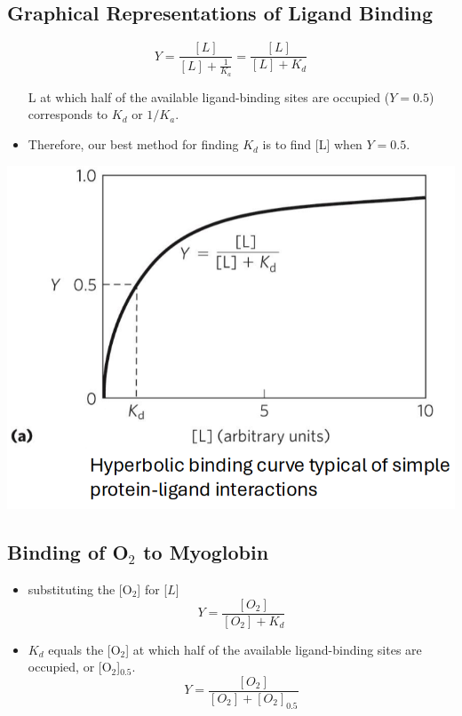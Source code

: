 \documentclass[10pt]{article}
\begin{document}
\subsection*{Graphical Representations of Ligand Binding}
\[Y = \frac{[L]}{[L] + \frac{1}{K_a}} = \frac{[L]}{[L] + K_d}\]
\begin{itemize}
    \item [L] at which half of the available ligand-binding sites are occupied ($Y = 0.5$) corresponds to $K_d$ or $1 / K_a$.
    \item Therefore, our best method for finding $K_d$ is to find [L] when $Y = 0.5$.
\end{itemize}
\begin{center}
    \includegraphics*[scale=0.5]{L2_8.png}
\end{center}

\subsection*{Binding of O$_2$ to Myoglobin}
\begin{itemize}
    \item substituting the [O$_2$] for [$L$]
    \[Y = \frac{[O_2]}{[O_2] + K_d}\]
    \item $K_d$ equals the [O$_2$] at which half of the available ligand-binding sites are occupied, or [O$_2$]$_{0.5}$.
    \[Y = \frac{[O_2]}{[O_2] + [O_2]_{0.5}}\]
\end{itemize}
\end{document}
